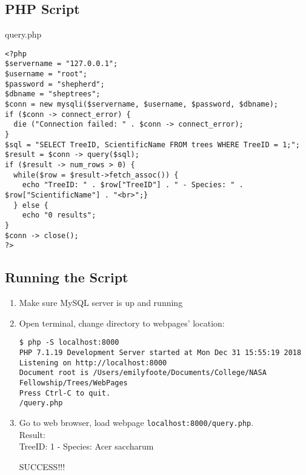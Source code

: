 \documentclass{article}
\begin{document}
\subsection{PHP Script}
query.php
\begin{verbatim}
<?php
$servername = "127.0.0.1";
$username = "root";
$password = "shepherd";
$dbname = "sheptrees";
$conn = new mysqli($servername, $username, $password, $dbname);
if ($conn -> connect_error) {
  die ("Connection failed: " . $conn -> connect_error);
}
$sql = "SELECT TreeID, ScientificName FROM trees WHERE TreeID = 1;";
$result = $conn -> query($sql);
if ($result -> num_rows > 0) {
  while($row = $result->fetch_assoc()) {
    echo "TreeID: " . $row["TreeID"] . " - Species: " . $row["ScientificName"] . "<br>";}
  } else {
    echo "0 results";
}
$conn -> close();
?>
\end{verbatim}
\subsection{Running the Script}\begin{enumerate}
    \item Make sure MySQL server is up and running
    \item Open terminal, change directory to webpages' location:\begin{verbatim}
$ php -S localhost:8000
PHP 7.1.19 Development Server started at Mon Dec 31 15:55:19 2018
Listening on http://localhost:8000
Document root is /Users/emilyfoote/Documents/College/NASA Fellowship/Trees/WebPages
Press Ctrl-C to quit.
/query.php
\end{verbatim}
    \item Go to web browser, load webpage \texttt{localhost:8000/query.php}.\\
Result: \\
TreeID: 1 - Species: Acer saccharum

SUCCESS!!!
\end{enumerate}
\end{document}
